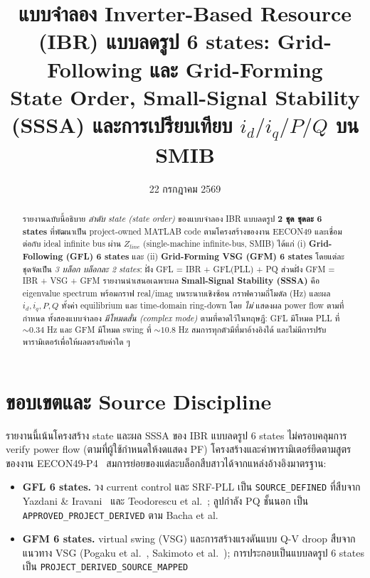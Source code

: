 \documentclass[12pt,a4paper]{article}
\title{\textbf{แบบจำลอง Inverter-Based Resource (IBR) แบบลดรูป 6 states: Grid-Following และ Grid-Forming}\\
\large State Order, Small-Signal Stability (SSSA) และการเปรียบเทียบ $i_d/i_q/P/Q$ บน SMIB}
\date{22 กรกฎาคม 2569}
\begin{document}
\maketitle

\begin{abstract}
รายงานฉบับนี้อธิบาย \emph{ลำดับ state (state order)} ของแบบจำลอง IBR แบบลดรูป \textbf{2 ชุด ชุดละ
6 states} ที่พัฒนาเป็น project-owned MATLAB code ตามโครงสร้างของงาน EECON49 และเชื่อมต่อกับ ideal
infinite bus ผ่าน $Z_{line}$ (single-machine infinite-bus, SMIB) ได้แก่ (i) \textbf{Grid-Following
(GFL) 6 states} และ (ii) \textbf{Grid-Forming VSG (GFM) 6 states} โดยแต่ละชุดจัดเป็น \emph{3 บล็อก
บล็อกละ 2 states}: ฝั่ง GFL = IBR + GFL(PLL) + PQ ส่วนฝั่ง GFM = IBR + VSG + GFM รายงานนำเสนอเฉพาะผล
\textbf{Small-Signal Stability (SSSA)} คือ eigenvalue spectrum พร้อมกราฟ real/imag บนระนาบเชิงซ้อน
กราฟความถี่โมดัล (Hz) และผล $i_d,i_q,P,Q$ ทั้งค่า equilibrium และ time-domain ring-down โดย
\emph{ไม่} แสดงผล power flow ตามที่กำหนด ทั้งสองแบบจำลอง \emph{มีโหมดสั่น (complex mode)} ตามที่คาดไว้ในทฤษฎี:
GFL มีโหมด PLL ที่ $\sim0.34$ Hz และ GFM มีโหมด swing ที่ $\sim10.8$ Hz สมการทุกตัวมีที่มาอ้างอิงได้
และไม่มีการปรับพารามิเตอร์เพื่อให้ผลตรงกับค่าใด ๆ
\end{abstract}
\newpage
\tableofcontents
\newpage

\section{ขอบเขตและ Source Discipline}

รายงานนี้เน้นโครงสร้าง state และผล SSSA ของ IBR แบบลดรูป 6 states ไม่ครอบคลุมการ verify power flow
(ตามที่ผู้ใช้กำหนดให้งดแสดง PF) โครงสร้างและค่าพารามิเตอร์ยึดตามสูตรของงาน EECON49-P4~\cite{eecon49}
สมการย่อยของแต่ละบล็อกสืบสาวได้จากแหล่งอ้างอิงมาตรฐาน:

\begin{itemize}
  \item \textbf{GFL 6 states.} วง current control และ SRF-PLL เป็น \texttt{SOURCE\_DEFINED} ที่สืบจาก
  Yazdani \& Iravani~\cite{yazdani2010} และ Teodorescu et al.~\cite{teodorescu2011}; ลูปกำลัง PQ ชั้นนอก
  เป็น \texttt{APPROVED\_PROJECT\_DERIVED} ตาม Bacha et al.~\cite{bacha2014}
  \item \textbf{GFM 6 states.} virtual swing (VSG) และการสร้างแรงดันแบบ Q-V droop สืบจากแนวทาง VSG
  (Pogaku et al.~\cite{pogaku2007}, Sakimoto et al.~\cite{sakimoto2015}); การประกอบเป็นแบบลดรูป 6 states
  เป็น \texttt{PROJECT\_DERIVED\_SOURCE\_MAPPED}
\end{itemize}
\end{document}

